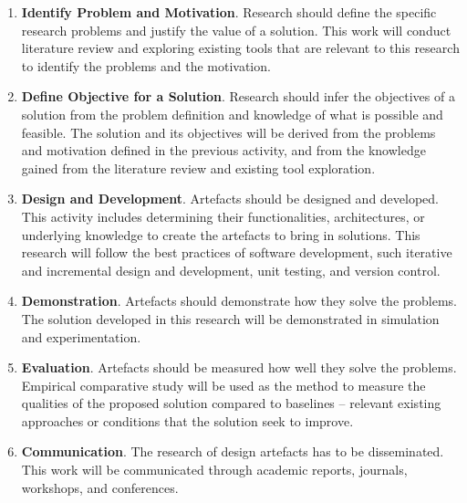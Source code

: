 \documentclass[12pt, a4paper]{report} \usepackage[titletoc]{appendix}
\begin{document}
\begin{enumerate}
    \item \textbf{Identify Problem and Motivation}. Research should define the specific research problems and justify the value of a solution. This work will conduct literature review and exploring existing tools that are relevant to this research to identify the problems and the motivation.
    \item \textbf{Define Objective for a Solution}. Research should infer the objectives of a solution from the problem definition and knowledge of what is possible and feasible. The solution and its objectives will be derived from the problems and motivation defined in the previous activity, and from the knowledge gained from the literature review and existing tool exploration.
    \item \textbf{Design and Development}. Artefacts should be designed and developed. This activity includes determining their functionalities, architectures, or underlying knowledge to create the artefacts to bring in solutions. This research will follow the best practices of software development, such iterative and incremental design and development, unit testing, and version control.
    \item \textbf{Demonstration}. Artefacts should demonstrate how they solve the problems. The solution developed in this research will be demonstrated in simulation and experimentation. 
    \item \textbf{Evaluation}. Artefacts should be measured how well they solve the problems. Empirical comparative study will be used as the method to measure the qualities of the proposed solution compared to baselines -- relevant existing approaches or conditions that the solution seek to improve.
    \item \textbf{Communication}. The research of design artefacts has to be disseminated. This work will be communicated through academic reports, journals, workshops, and conferences.
\end{enumerate}
\end{document}

